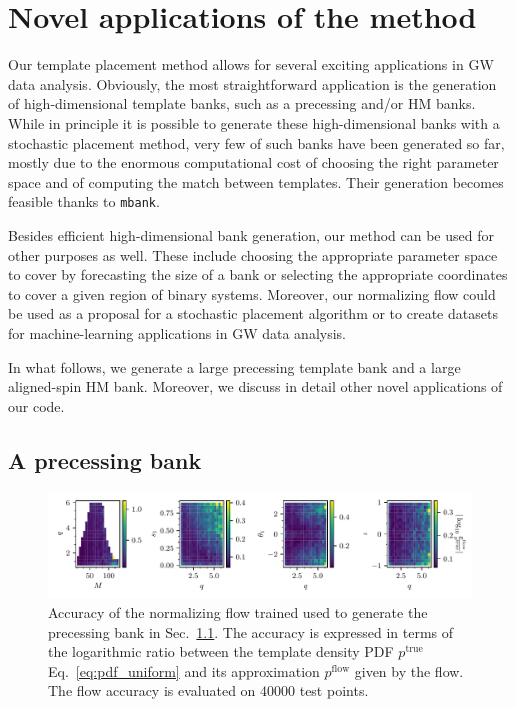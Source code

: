 \documentclass[twocolumn,showpacs,preprintnumbers,nofootinbib,prd,
superscriptaddress,10pt]{revtex4-2}
\begin{document}
\section{Novel applications of the method} \label{sec:novel_applications}

Our template placement method allows for several exciting applications in GW data analysis.
Obviously, the most straightforward application is the generation of high-dimensional template banks, such as a precessing and/or HM banks. While in principle it is possible to generate these high-dimensional banks with a stochastic placement method, very few of such banks have been generated so far, mostly due to the enormous computational cost of choosing the right parameter space and of computing the match between templates. Their generation becomes feasible thanks to \texttt{mbank}.

Besides efficient high-dimensional bank generation, our method can be used for other purposes as well. These include choosing the appropriate parameter space to cover by forecasting the size of a bank or selecting the appropriate coordinates to cover a given region of binary systems. Moreover, our normalizing flow could be used as a proposal for a stochastic placement algorithm or to create datasets for machine-learning applications in GW data analysis.

In what follows, we generate a large precessing template bank and a large aligned-spin HM bank. Moreover, we discuss in detail other novel applications of our code.

\subsection{A precessing bank} \label{sec:precessing_bank}

\begin{figure}[t]
		\includegraphics[scale = 1.]{precessing_flow_accuracy}
		\caption{Accuracy of the normalizing flow trained used to generate the precessing bank in Sec.~\ref{sec:precessing_bank}. The accuracy is expressed in terms of the logarithmic ratio between the template density PDF $p^\text{true}$ Eq.~\eqref{eq:pdf_uniform} and its approximation $p^\text{flow}$ given by the flow. The flow accuracy is evaluated on $40000$ test points.}
		\label{fig:precessing_flow}
\end{figure}
\end{document}
